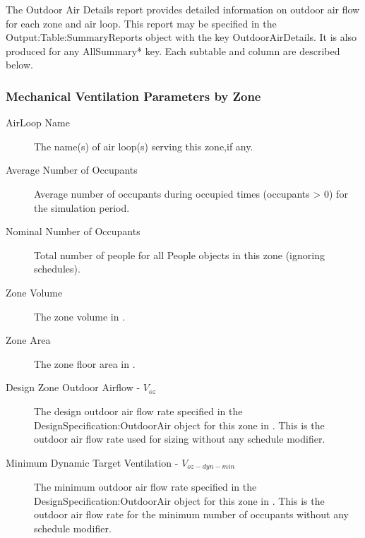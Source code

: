 The Outdoor Air Details report provides detailed information on outdoor air flow for each zone and air loop. This report may be specified in the  Output:Table:SummaryReports object with the key OutdoorAirDetails. It is also produced for any AllSummary* key. Each subtable and column are described below.

\subsubsection{Mechanical Ventilation Parameters by Zone}\label{mechanical-ventilation-parameters-by-zone}
\begin{description}
  \item[AirLoop Name] The name(s) of air loop(s) serving this zone,if any.
  \item[Average Number of Occupants] Average number of occupants during occupied times (occupants > 0) for the simulation period.
  \item[Nominal Number of Occupants] Total number of people for all People objects in this zone (ignoring schedules).
  \item[Zone Volume] The zone volume in \si{\volume}.
  \item[Zone Area] The zone floor area in \si{\area}.
  \item[Design Zone Outdoor Airflow - \(V_{oz}\)] The design outdoor air flow rate specified in the DesignSpecification:OutdoorAir object for this zone in \si{\volumeFlowRate}. This is the outdoor air flow rate used for sizing without any schedule modifier.
  \item[Minimum Dynamic Target Ventilation - \(V_{oz-dyn-min}\)] The minimum outdoor air flow rate specified in the DesignSpecification:OutdoorAir object for this zone in \si{\volumeFlowRate}. This is the outdoor air flow rate for the minimum number of occupants without any schedule modifier.
\end{description}

